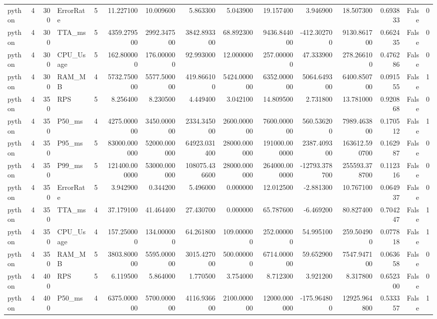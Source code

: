 \begin{tabular}{lrrlrrrrrrrrrrr}
python & 4 & 300 & ErrorRate & 5 & 11.227100 & 10.009600 & 5.863300 & 5.043900 & 19.157400 & 3.946900 & 18.507300 & 0.693833 & False & 0 \\
python & 4 & 300 & TTA_ms & 5 & 4359.279500 & 2992.347500 & 3842.893300 & 68.892300 & 9436.844000 & -412.302700 & 9130.861700 & 0.662435 & False & 0 \\
python & 4 & 300 & CPU_Usage & 5 & 162.800000 & 176.000000 & 92.993000 & 12.000000 & 257.000000 & 47.333900 & 278.266100 & 0.476286 & False & 0 \\
python & 4 & 300 & RAM_MB & 4 & 5732.750000 & 5577.500000 & 419.866100 & 5424.000000 & 6352.000000 & 5064.649300 & 6400.850700 & 0.091555 & False & 1 \\
python & 4 & 350 & RPS & 5 & 8.256400 & 8.230500 & 4.449400 & 3.042100 & 14.809500 & 2.731800 & 13.781000 & 0.920868 & False & 0 \\
python & 4 & 350 & P50_ms & 4 & 4275.000000 & 3450.000000 & 2334.345000 & 2600.000000 & 7600.000000 & 560.536200 & 7989.463800 & 0.170512 & False & 1 \\
python & 4 & 350 & P95_ms & 5 & 83000.000000 & 52000.000000 & 64923.031400 & 28000.000000 & 191000.000000 & 2387.409300 & 163612.590700 & 0.162987 & False & 0 \\
python & 4 & 350 & P99_ms & 5 & 121400.000000 & 53000.000000 & 108075.436600 & 28000.000000 & 264000.000000 & -12793.378700 & 255593.378700 & 0.112316 & False & 0 \\
python & 4 & 350 & ErrorRate & 5 & 3.942900 & 0.344200 & 5.496000 & 0.000000 & 12.012500 & -2.881300 & 10.767100 & 0.064937 & False & 0 \\
python & 4 & 350 & TTA_ms & 4 & 37.179100 & 41.464400 & 27.430700 & 0.000000 & 65.787600 & -6.469200 & 80.827400 & 0.704247 & False & 1 \\
python & 4 & 350 & CPU_Usage & 4 & 157.250000 & 134.000000 & 64.261800 & 109.000000 & 252.000000 & 54.995100 & 259.504900 & 0.077818 & False & 1 \\
python & 4 & 350 & RAM_MB & 5 & 3803.800000 & 5595.000000 & 3015.427000 & 500.000000 & 6714.000000 & 59.652900 & 7547.947100 & 0.063658 & False & 0 \\
python & 4 & 400 & RPS & 5 & 6.119500 & 5.864000 & 1.770500 & 3.754000 & 8.712300 & 3.921200 & 8.317800 & 0.652300 & False & 0 \\
python & 4 & 400 & P50_ms & 4 & 6375.000000 & 5700.000000 & 4116.936600 & 2100.000000 & 12000.000000 & -175.964800 & 12925.964800 & 0.533357 & False & 1 \\

\end{tabular}
